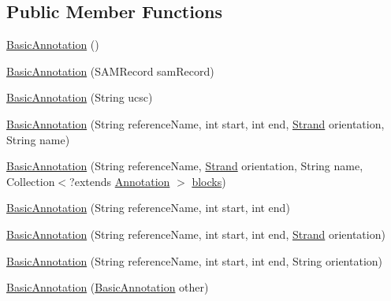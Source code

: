 \subsection*{Public Member Functions}
\begin{DoxyCompactItemize}
\item 
\hyperlink{classumms_1_1core_1_1annotation_1_1_basic_annotation_a210147f31fba19c7811032e1b651c1d0}{Basic\+Annotation} ()
\item 
\hyperlink{classumms_1_1core_1_1annotation_1_1_basic_annotation_a2d9ba308c05e51125f286f4d575d0a60}{Basic\+Annotation} (S\+A\+M\+Record sam\+Record)
\item 
\hyperlink{classumms_1_1core_1_1annotation_1_1_basic_annotation_ad7ab3606eeaae43afcb1eccb45693e9b}{Basic\+Annotation} (String ucsc)
\item 
\hyperlink{classumms_1_1core_1_1annotation_1_1_basic_annotation_aaf0db2545fb5b17589e29427c70ef82b}{Basic\+Annotation} (String reference\+Name, int start, int end, \hyperlink{enumumms_1_1core_1_1annotation_1_1_annotation_1_1_strand}{Strand} orientation, String name)
\item 
\hyperlink{classumms_1_1core_1_1annotation_1_1_basic_annotation_ad0c1d8c42639620f65191c183501efa0}{Basic\+Annotation} (String reference\+Name, \hyperlink{enumumms_1_1core_1_1annotation_1_1_annotation_1_1_strand}{Strand} orientation, String name, Collection$<$?extends \hyperlink{interfaceumms_1_1core_1_1annotation_1_1_annotation}{Annotation} $>$ \hyperlink{classumms_1_1core_1_1annotation_1_1_basic_annotation_a8d54dfeeeaf679fd40a2c3bb5a2db3e0}{blocks})
\item 
\hyperlink{classumms_1_1core_1_1annotation_1_1_basic_annotation_a9d4c8ee3c90780e37b7a1b828a1e6e53}{Basic\+Annotation} (String reference\+Name, int start, int end)
\item 
\hyperlink{classumms_1_1core_1_1annotation_1_1_basic_annotation_a218fe5c828746d5576203018aec052d8}{Basic\+Annotation} (String reference\+Name, int start, int end, \hyperlink{enumumms_1_1core_1_1annotation_1_1_annotation_1_1_strand}{Strand} orientation)
\item 
\hyperlink{classumms_1_1core_1_1annotation_1_1_basic_annotation_ad488fe77fc5e3854e3067f5f1938befb}{Basic\+Annotation} (String reference\+Name, int start, int end, String orientation)
\item 
\hyperlink{classumms_1_1core_1_1annotation_1_1_basic_annotation_af27040dddef26cd6ed35fad5ec65220d}{Basic\+Annotation} (\hyperlink{classumms_1_1core_1_1annotation_1_1_basic_annotation}{Basic\+Annotation} other)

\end{DoxyCompactItemize}
